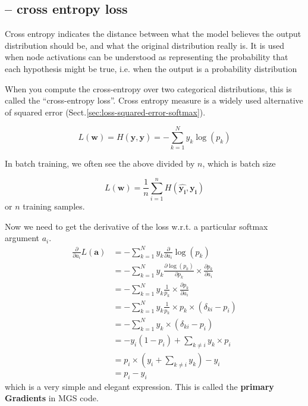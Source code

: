 \subsection{-- cross entropy loss}
\label{sec:loss-cross-entropy-softmax}

Cross entropy indicates the distance between what the model believes the output
distribution should be, and what the original distribution really is.
It is used when node activations can be understood as representing the
probability that each hypothesis might be true, i.e. when the output is a
probability distribution

When you compute the cross-entropy over two categorical distributions, this is
called the “cross-entropy loss”. Cross entropy measure is a widely used
alternative of squared error (Sect.\ref{sec:loss-squared-error-softmax}).

\begin{equation}
L(\mathbf{w}) = H(\mathbf{\hat{y}}, \mathbf{y}) = - \sum_{k=1}^N y_k \log(p_k)
\end{equation}

\begin{mdframed}
In batch training, we often see the above divided by $n$, which is batch size

\begin{equation}
L(\mathbf{w}) = \frac{1}{n} \sum_{i=1}^n H(\mathbf{\hat{y_i}}, \mathbf{y_i})
\end{equation}
or $n$ training samples.
\end{mdframed}


Now we need to get the derivative of the loss w.r.t. a particular softmax argument $a_i$. 
\begin{equation}
\begin{split}
\frac{\partial}{\partial a_i}L(\mathbf{a}) &= - \sum_{k=1}^N y_k \frac{\partial}{\partial a_i}\log(p_k) \\
   &= - \sum_{k=1}^N y_k \frac{\partial \log(p_k)}{\partial p_k} \times \frac{\partial p_k}{\partial a_i}\\
   &= - \sum_{k=1}^N y_k \frac{1}{p_k} \times \frac{\partial p_k}{\partial a_i} \\
   &= - \sum_{k=1}^N y_k \frac{1}{p_k} \times p_k \times (\delta_{ki} - p_i) \\
   &= - \sum_{k=1}^N y_k \times (\delta_{ki} - p_i) \\
   &= - y_i (1 - p_i) + \sum_{k \ne i} y_k \times p_i \\
   &= p_i \times (y_i + \sum_{k \ne i} y_k) - y_i \\
   &= p_i - y_i
\end{split}
\end{equation}
which is a very simple and elegant expression. This is called the {\bf primary Gradients} in MGS code.

